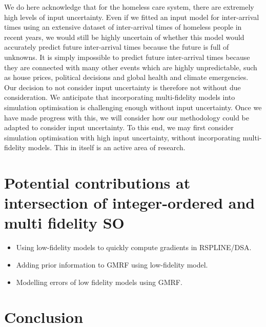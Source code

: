 \documentclass[12pt,a4paper]{article}
\begin{document}
We do here acknowledge that for the homeless care system, there are extremely high levels of input uncertainty. Even if we fitted an input model for inter-arrival times using an extensive dataset of inter-arrival times of homeless people in recent years, we would still be highly uncertain of whether this model would accurately predict future inter-arrival times because the future is full of unknowns. It is simply impossible to predict future inter-arrival times because they are connected with many other events which are highly unpredictable, such as house prices, political decisions and global health and climate emergencies. Our decision to not consider input uncertainty is therefore not without due consideration. We anticipate that incorporating multi-fidelity models into simulation optimisation is challenging enough without input uncertainty. Once we have made progress with this, we will consider how our methodology could be adapted to consider input uncertainty. To this end, we may first consider simulation optimisation with high input uncertainty, without incorporating multi-fidelity models. This in itself is an active area of research.

\newpage

\section{Potential contributions at intersection of integer-ordered and multi fidelity SO} \label{mfso}

\begin{itemize}[noitemsep]
\item Using low-fidelity models to quickly compute gradients in RSPLINE/DSA.
\item Adding prior information to GMRF using low-fidelity model.
\item Modelling errors of low fidelity models using GMRF.
\end{itemize}

\newpage

\section{Conclusion}\label{conc}

\newpage



\end{document}
